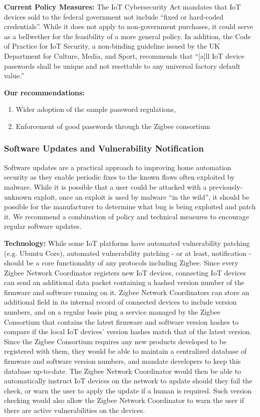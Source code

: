 {\bf Current Policy Measures:} The IoT Cybersecurity Act mandates that IoT devices sold to the federal government not include “fixed or hard-coded credentials”. While it does not apply to non-government purchases, it could serve as a bellwether for the feasibility of a more general policy. In addition, the Code of Practice for IoT Security, a non-binding guideline issued by the UK Department for Culture, Media, and Sport, recommends that “[a]ll IoT device passwords shall be unique and not resettable to any universal factory default value.” 

{\bf Our recommendations:}
\begin{enumerate}
\item Wider adoption of the sample password regulations,
\item Enforcement of good passwords through the Zigbee consortium
\end{enumerate}



\subsubsection{Software Updates and Vulnerability Notification}
Software updates are a practical approach to improving home automation security as they enable periodic fixes to the known flaws often exploited by malware. While it is possible that a user could be attacked with a previously-unknown exploit, once an exploit is used by malware “in the wild”, it should be possible for the manufacturer to determine what bug is being exploited and patch it. We recommend a combination of policy and technical measures to encourage regular software updates.

{\bf Technology:} While some IoT platforms have automated vulnerability patching (e.g. Ubuntu Core), automated vulnerability patching - or at least, notification - should be a core functionality of any protocols including Zigbee. Since every Zigbee Network Coordinator registers new IoT devices, connecting IoT devices can send an additional data packet containing a hashed version number of the firmware and software running on it. Zigbee Network Coordinators can store an additional field in its internal record of connected devices to include version numbers, and on a regular basis ping a service managed by the Zigbee Consortium that contains the latest firmware and software version hashes to compare if the local IoT devices’ version hashes match that of the latest version. Since the Zigbee Consortium requires any new products developed to be registered with them, they would be able to maintain a centralized database of firmware and software version numbers, and mandate developers to keep this database up-to-date. The Zigbee Network Coordinator would then be able to automatically instruct IoT devices on the network to update should they fail the check, or warn the user to apply the update if a human is required. Such version checking would also allow the Zigbee Network Coordinator to warn the user if there are active vulnerabilities on the devices.

